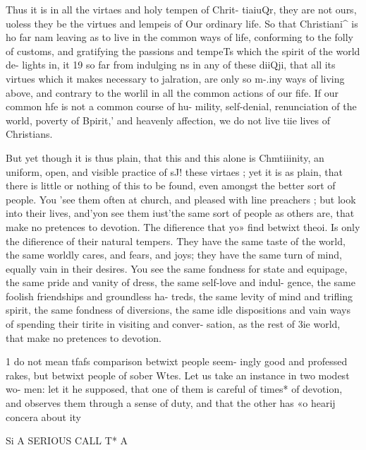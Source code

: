 \documentclass[
]{book}
\begin{document}
Thus it is in all the virtaes and holy tempen of Chrit- tiaiuQr, they are not ours, uoless they be the virtues and lempeis of Our ordinary life. So that Christiani\^{} is ho far nam leaving as to live in the common ways of life, conforming to the folly of customs, and gratifying the passions and tempeTs which the spirit of the world de- lights in, it 19 so far from indulging ns in any of these diiQji, that all its virtues which it makes necessary to jalration, are only so m-.iny ways of living above, and contrary to the worlil in all the common actions of our fife. If our common hfe is not a common course of hu- mility, self-denial, renunciation of the world, poverty of Bpirit,' and heavenly affection, we do not live tiie lives of Christians.

But yet though it is thus plain, that this and this alone is Chmtiiinity, an uniform, open, and visible practice of sJ! these virtaes ; yet it is as plain, that there is little or nothing of this to be found, even amongst the better sort of people. You 'see them often at church, and pleased with line preachers ; but look into their lives, and'yon see them iust'the same sort of people as others are, that make no pretences to devotion. The difierence that yo» find betwixt theoi. Is only the difierence of their natural tempers. They have the same taste of the world, the same worldly cares, and fears, and joys; they have the same turn of mind, equally vain in their desires. You see the same fondness for state and equipage, the same pride and vanity of dress, the same self-love and indul- gence, the same foolish friendships and groundless ha- treds, the same levity of mind and trifling spirit, the same fondness of diversions, the same idle dispositions and vain ways of spending their tirite in visiting and conver- sation, as the rest of 3ie world, that make no pretences to devotion.

1 do not mean tfafs comparison betwixt people seem- ingly good and professed rakes, but betwixt people of sober Wtes. Let us take an instance in two modest wo- men: let it he supposed, that one of them is careful of times* of devotion, and observes them through a sense of duty, and that the other has «o hearij concera about ity

Si A SERIOUS CALL T* A
\end{document}
